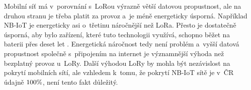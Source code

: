 Mobilní síť má v~porovnání s~LoRou výrazně větší datovou propustnost, ale na druhou stranu je třeba platit za provoz a~je méně energeticky úsporná.
Například \\NB-IoT je energeticky asi o~třetinu náročnější než LoRa.
Přesto je dostatečně úsporná, aby bylo zařízení, které tuto technologii využívá, schopno běžet na baterii přes deset let \cite{LoRaVSNB-IoT}.
Energetická náročnost tedy není problém a~vyšší datová propustnost společně s~připojením na internet je významnější výhoda než bezplatný provoz u~LoRy.
Další výhodou LoRy by mohla být nezávislost na pokrytí mobilních sítí, ale vzhledem k~tomu, že pokrytí NB-IoT sítě je v~ČR údajně \(100\-\%\)\cite{NB-IoTPokryti}, není tento fakt důležitý. 
